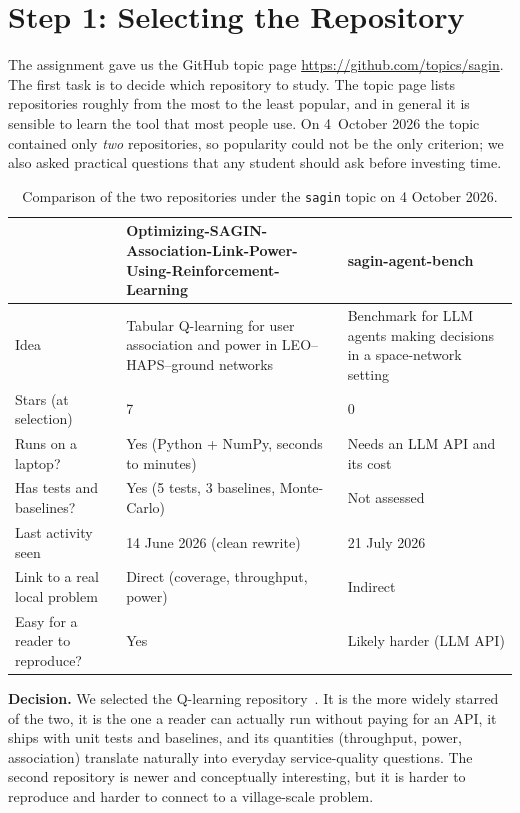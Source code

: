 \documentclass[11pt,a4paper]{article}
\begin{document}
\section{Step 1: Selecting the Repository}
\label{sec:select}

The assignment gave us the GitHub topic page \url{https://github.com/topics/sagin}. The first task is to decide which repository to study. The topic page lists repositories roughly from the most to the least popular, and in general it is sensible to learn the tool that most people use. On 4~October 2026 the topic contained only \emph{two} repositories, so popularity could not be the only criterion; we also asked practical questions that any student should ask before investing time.

\begin{table}[h]
\centering\small
\begin{tabular}{p{4.4cm}p{5.2cm}p{5.2cm}}
\toprule
 & \textbf{Optimizing-SAGIN-Association-Link-Power-Using-Reinforcement-Learning} & \textbf{sagin-agent-bench} \\
\midrule
Idea & Tabular Q-learning for user association and power in LEO--HAPS--ground networks & Benchmark for LLM agents making decisions in a space-network setting \\
Stars (at selection) & 7 & 0 \\
Runs on a laptop? & Yes (Python + NumPy, seconds to minutes) & Needs an LLM API and its cost \\
Has tests and baselines? & Yes (5 tests, 3 baselines, Monte-Carlo) & Not assessed \\
Last activity seen & 14 June 2026 (clean rewrite) & 21 July 2026 \\
Link to a real local problem & Direct (coverage, throughput, power) & Indirect \\
Easy for a reader to reproduce? & Yes & Likely harder (LLM API) \\
\bottomrule
\end{tabular}
\caption{Comparison of the two repositories under the \texttt{sagin} topic on 4 October 2026.}
\label{tab:repos}
\end{table}

\textbf{Decision.} We selected the Q-learning repository~\cite{repo}. It is the more widely starred of the two, it is the one a reader can actually run without paying for an API, it ships with unit tests and baselines, and its quantities (throughput, power, association) translate naturally into everyday service-quality questions. The second repository is newer and conceptually interesting, but it is harder to reproduce and harder to connect to a village-scale problem.
\end{document}

